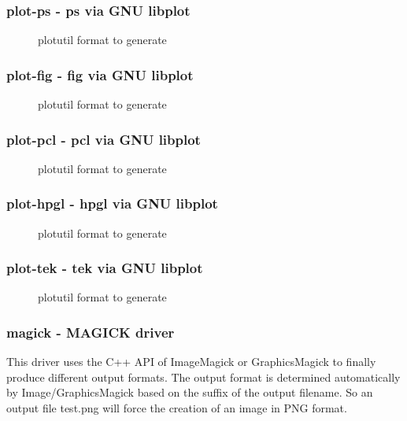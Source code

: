 \documentclass[english,a4paper]{article}
\begin{document}
\subsubsection{plot-ps - ps   via GNU libplot}
\begin{description}
\item[] 
plotutil format to generate


\end{description}
\subsubsection{plot-fig - fig  via GNU libplot}
\begin{description}
\item[] 
plotutil format to generate


\end{description}
\subsubsection{plot-pcl - pcl  via GNU libplot}
\begin{description}
\item[] 
plotutil format to generate


\end{description}
\subsubsection{plot-hpgl - hpgl via GNU libplot}
\begin{description}
\item[] 
plotutil format to generate


\end{description}
\subsubsection{plot-tek - tek  via GNU libplot}
\begin{description}
\item[] 
plotutil format to generate


\end{description}
\subsubsection{magick - MAGICK driver}
This driver uses the C++ API of ImageMagick or GraphicsMagick to finally produce different output formats. The output format is determined automatically by Image/GraphicsMagick based on the suffix of the output filename. So an output file test.png will force the creation of an image in PNG format.
\end{document}
